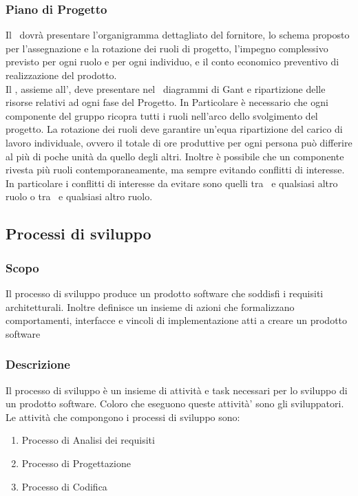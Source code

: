 \documentclass[12pt,a4paper]{article}
\begin{document}
\subsubsection{Piano di Progetto} %
Il \PdP\ dovrà presentare l'organigramma dettagliato del fornitore, lo schema proposto per l'assegnazione e la rotazione dei ruoli di progetto, l'impegno complessivo previsto per ogni ruolo e per ogni individuo, e il conto economico preventivo di realizzazione del prodotto.\\
Il \PM, assieme all'\AM, deve presentare nel \PdP\ diagrammi di Gant e ripartizione delle risorse relativi ad ogni fase del Progetto. In Particolare è necessario che ogni componente del gruppo ricopra tutti i ruoli nell'arco dello svolgimento del progetto. La rotazione dei ruoli deve garantire un'equa ripartizione del carico di lavoro individuale, ovvero il totale di ore produttive per ogni persona può differire al più di poche unità da quello degli altri. Inoltre è possibile che un componente rivesta più ruoli contemporaneamente, ma sempre evitando conflitti di interesse. In particolare i conflitti di interesse da evitare sono quelli tra \PM\ e qualsiasi altro ruolo o tra \VR\ e qualsiasi altro ruolo.

\subsection{Processi di sviluppo}

\subsubsection{Scopo}
Il processo di sviluppo produce un prodotto software che soddisfi i requisiti architetturali. Inoltre definisce un insieme di azioni che formalizzano comportamenti, interfacce e vincoli di implementazione atti a creare un prodotto software

\subsubsection{Descrizione}
Il processo di sviluppo è un insieme di attività e task necessari per lo sviluppo di un prodotto software. Coloro che eseguono queste attività' sono gli sviluppatori. Le attività che compongono i processi di sviluppo sono:
\begin{enumerate}
\item Processo di Analisi dei requisiti
\item Processo di Progettazione
\item Processo di Codifica
\end{enumerate}
\end{document}
